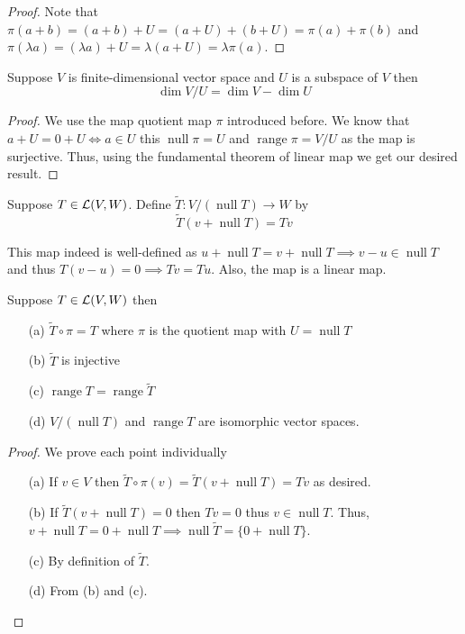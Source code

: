 \begin{proof}
    Note that $\pi(a+b)=(a+b)+U=(a+U)+(b+U)=\pi(a)+\pi(b)$ and $\pi(\lambda a) = (\lambda a) + U = \lambda(a+U) = \lambda \pi(a)$. 
\end{proof}

\begin{proposition}
    Suppose $V$ is finite-dimensional vector space and $U$ is a subspace of $V$ then
    \[ \dim V/U  = \dim V - \dim U\]
\end{proposition}

\begin{proof}
    We use the map quotient map $\pi$ introduced before. We know that $a+U = 0+U \iff a \in U$ this $\operatorname{null} \pi = U$ and 
    $\operatorname{range} \pi = V/U$ as the map is surjective. Thus, using the fundamental theorem of linear map we get our desired result. 
\end{proof}

\begin{definition}
    Suppose $T \in \operatorname{\mathcal{L}}(V,W)$. Define $\widetilde{T} : V/(\operatorname{null} T) \to W$ by
    \[ \widetilde{T}(v+\operatorname{null} T) = Tv \]
\end{definition}

This map indeed is well-defined as $u+\operatorname{null} T = v + \operatorname{null} T \implies v-u \in \operatorname{null} T$ and thus
$T(v-u) = 0 \implies Tv=Tu$. Also, the map is a linear map.


\begin{proposition}
    Suppose $T \in \operatorname{\mathcal{L}}(V,W)$ then
    \begin{enumerate}
        \item[(a)] $\widetilde{T} \circ \pi = T$ where $\pi$ is the quotient map with $U=\operatorname{null} T$
        \item[(b)] $\widetilde{T}$ is injective
        \item[(c)] $\operatorname{range} T = \operatorname{range} \widetilde{T}$
        \item[(d)] $V/(\operatorname{null} T)$ and $\operatorname{range} T $ are isomorphic vector spaces.   
    \end{enumerate}
\end{proposition}

\begin{proof} We prove each point individually 
    \begin{enumerate}
        \item[(a)] If $v \in V$ then $\widetilde{T} \circ \pi (v) = \widetilde{T}(v+\operatorname{null} T) = Tv$ as desired.
        \item[(b)] If $\widetilde{T}(v+\operatorname{null} T )=0$ then $Tv=0$ thus $v \in \operatorname{null} T $. Thus,
            $v+\operatorname{null} T = 0 + \operatorname{null} T \implies \operatorname{null} \widetilde{T} = \{0+\operatorname{null} T\}$.
        \item[(c)] By definition of $\widetilde{T}$.
        \item[(d)] From (b) and (c).  
    \end{enumerate}
\end{proof}


